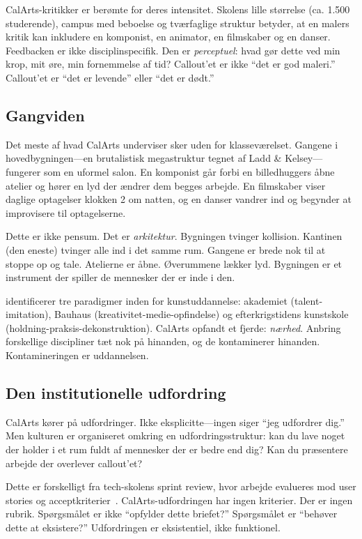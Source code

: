 \documentclass[10pt,letterpaper,twocolumn]{article}
\begin{document}
CalArts-kritikker er berømte for deres intensitet. Skolens lille størrelse (ca. 1.500 studerende), campus med beboelse og tværfaglige struktur betyder, at en malers kritik kan inkludere en komponist, en animator, en filmskaber og en danser. Feedbacken er ikke disciplinspecifik. Den er \emph{perceptuel}: hvad gør dette ved min krop, mit øre, min fornemmelse af tid? Callout'et er ikke ``det er god maleri.'' Callout'et er ``det er levende'' eller ``det er dødt.''

\subsection{Gangviden}

Det meste af hvad CalArts underviser sker uden for klasseværelset. Gangene i hovedbygningen---en brutalistisk megastruktur tegnet af Ladd \& Kelsey---fungerer som en uformel salon. En komponist går forbi en billedhuggers åbne atelier og hører en lyd der ændrer dem begges arbejde. En filmskaber viser daglige optagelser klokken 2 om natten, og en danser vandrer ind og begynder at improvisere til optagelserne.

Dette er ikke pensum. Det er \emph{arkitektur}. Bygningen tvinger kollision. Kantinen (den eneste) tvinger alle ind i det samme rum. Gangene er brede nok til at stoppe op og tale. Atelierne er åbne. Øverummene lækker lyd. Bygningen er et instrument der spiller de mennesker der er inde i den.

\citet{deduve1994attitude} identificerer tre paradigmer inden for kunstuddannelse: akademiet (talent-imitation), Bauhaus (kreativitet-medie-opfindelse) og efterkrigstidens kunstskole (holdning-praksis-dekonstruktion). CalArts opfandt et fjerde: \emph{nærhed}. Anbring forskellige discipliner tæt nok på hinanden, og de kontaminerer hinanden. Kontamineringen er uddannelsen.

\subsection{Den institutionelle udfordring}

CalArts kører på udfordringer. Ikke eksplicitte---ingen siger ``jeg udfordrer dig.'' Men kulturen er organiseret omkring en udfordringsstruktur: kan du lave noget der holder i et rum fuldt af mennesker der er bedre end dig? Kan du præsentere arbejde der overlever callout'et?

Dette er forskelligt fra tech-skolens sprint review, hvor arbejde evalueres mod user stories og acceptkriterier~\citep{vinsel2020innovation}. CalArts-udfordringen har ingen kriterier. Der er ingen rubrik. Spørgsmålet er ikke ``opfylder dette briefet?'' Spørgsmålet er ``behøver dette at eksistere?'' Udfordringen er eksistentiel, ikke funktionel.
\end{document}

